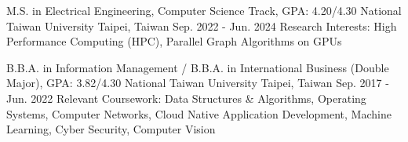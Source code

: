 

\begin{cventries}

  \cventry
    {M.S. in Electrical Engineering, Computer Science Track, GPA: 4.20/4.30} %
    {National Taiwan University} %
    {Taipei, Taiwan} %
    {Sep. 2022 - Jun. 2024} %
    {
      Research Interests: High Performance Computing (HPC), Parallel Graph Algorithms on GPUs
    }

  \cventry
    {B.B.A. in Information Management / B.B.A. in International Business (Double Major), GPA: 3.82/4.30} %
    {National Taiwan University} %
    {Taipei, Taiwan} %
    {Sep. 2017 - Jun. 2022} %
    {
      Relevant Coursework: Data Structures \& Algorithms, Operating Systems, Computer Networks, Cloud Native Application Development, Machine Learning, Cyber Security, Computer Vision
    }


\end{cventries}
